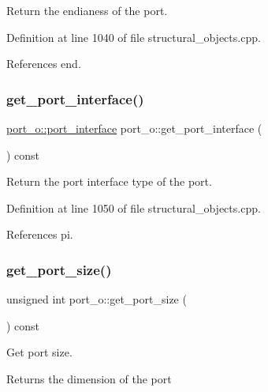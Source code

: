 Return the endianess of the port. 



Definition at line 1040 of file structural\+\_\+objects.\+cpp.



References end.

\mbox{\label{structport__o_a2e4c47c49aea2fdc63548452a1391599}} 
\subsubsection{\texorpdfstring{get\+\_\+port\+\_\+interface()}{get\_port\_interface()}}
{\footnotesize\ttfamily \hyperlink{structport__o_a37d2e6a450aea997028478f5bfb4e1f6}{port\+\_\+o\+::port\+\_\+interface} port\+\_\+o\+::get\+\_\+port\+\_\+interface (\begin{DoxyParamCaption}{ }\end{DoxyParamCaption}) const}



Return the port interface type of the port. 



Definition at line 1050 of file structural\+\_\+objects.\+cpp.



References pi.

\mbox{\label{structport__o_a7c8f3f6dab60cc5d4a81adce48a73d0c}} 
\subsubsection{\texorpdfstring{get\+\_\+port\+\_\+size()}{get\_port\_size()}}
{\footnotesize\ttfamily unsigned int port\+\_\+o\+::get\+\_\+port\+\_\+size (\begin{DoxyParamCaption}{ }\end{DoxyParamCaption}) const}



Get port size. 

\begin{DoxyReturn}{Returns}
the dimension of the port 
\end{DoxyReturn}


